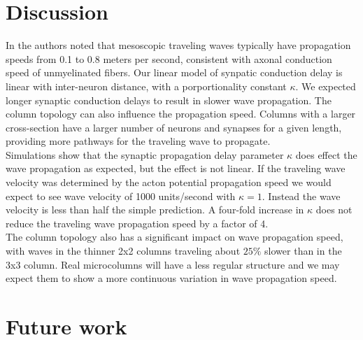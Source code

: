\documentclass[a4paper,11pt]{article}
\begin{document}
\section{Discussion}
In \cite{muller2018} the authors noted that mesoscopic traveling waves typically have propagation speeds from 0.1 to 0.8 meters per second, consistent with axonal conduction speed of unmyelinated fibers.
Our linear model of synpatic conduction delay is linear with inter-neuron distance, with a porportionality constant $\kappa$.
We expected longer synaptic conduction delays to result in slower wave propagation.
The column topology can also influence the propagation speed.
Columns with a larger cross-section have a larger number of neurons and synapses for a given length, providing more pathways for the traveling wave to propagate. \\
Simulations show that the synaptic propagation delay parameter $\kappa$ does effect the wave propagation as expected, but the effect is not linear.
If the traveling wave velocity was determined by the acton potential propagation speed we would expect to see wave velocity of 1000 units/second with $\kappa=1$.
Instead the wave velocity is less than half the simple prediction.
A four-fold increase in $\kappa$ does not reduce the traveling wave propagation speed by a factor of 4. \\
The column topology also has a significant impact on wave propagation speed, with waves in the thinner 2x2 columns traveling about $25\%$ slower than in the 3x3 column.
Real microcolumns will have a less regular structure and we may expect them to show a more continuous variation in wave propagation speed. 

\section{Future work}


\clearpage
\printbibliography
\end{document}
